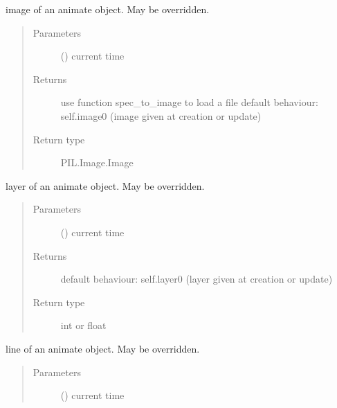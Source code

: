 \documentclass[letterpaper,10pt,english]{sphinxmanual}
\begin{document}
\begin{fulllineitems}
\begin{fulllineitems}
\label{\detokenize{Reference:salabim.Animate.image}}
image of an animate object. May be overridden.
\begin{quote}\begin{description}
\item[{Parameters}] \leavevmode
{} () \textendash{} current time

\item[{Returns}] \leavevmode
{} \textendash{} use function spec\_to\_image to load a file
default behaviour: self.image0 (image given at creation or update)

\item[{Return type}] \leavevmode
PIL.Image.Image

\end{description}\end{quote}

\end{fulllineitems}


\begin{fulllineitems}
\label{\detokenize{Reference:salabim.Animate.layer}}
layer of an animate object. May be overridden.
\begin{quote}\begin{description}
\item[{Parameters}] \leavevmode
{} () \textendash{} current time

\item[{Returns}] \leavevmode
{} \textendash{} default behaviour: self.layer0 (layer given at creation or update)

\item[{Return type}] \leavevmode
int or float

\end{description}\end{quote}

\end{fulllineitems}


\begin{fulllineitems}
\label{\detokenize{Reference:salabim.Animate.line}}
line of an animate object. May be overridden.
\begin{quote}\begin{description}
\item[{Parameters}] \leavevmode
{} () \textendash{} current time


\end{description}
\end{quote}
\end{fulllineitems}
\end{fulllineitems}
\end{document}
